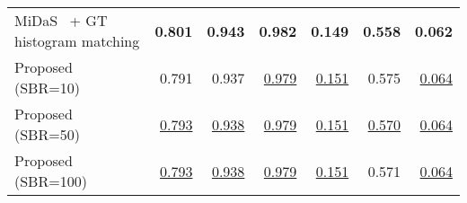 \begin{tabular}{lrrr|rrr}
\midrule
MiDaS~\cite{Lasinger:2019} + GT histogram matching      &      \textbf{0.801} &      \textbf{0.943} &      \textbf{0.982} &     \textbf{0.149} &     \textbf{0.558} &     \textbf{0.062} \\
Proposed (SBR=10)                  &               0.791 &               0.937 &   \underline{0.979} &  \underline{0.151} &              0.575 &  \underline{0.064} \\
Proposed (SBR=50)                  &   \underline{0.793} &   \underline{0.938} &   \underline{0.979} &  \underline{0.151} &  \underline{0.570} &  \underline{0.064} \\
Proposed (SBR=100)                 &   \underline{0.793} &   \underline{0.938} &   \underline{0.979} &  \underline{0.151} &              0.571 &  \underline{0.064} \\
\bottomrule
\end{tabular}
